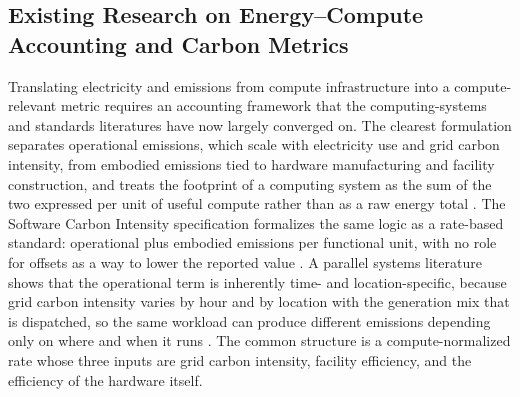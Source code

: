 \documentclass[12pt,a4paper]{article}
\begin{document}
\subsection{Existing Research on Energy--Compute Accounting and
Carbon Metrics}
%
%
%
%

Translating electricity and emissions from compute infrastructure
into a compute-relevant metric requires an accounting framework that
the computing-systems and standards literatures have now largely
converged on. The clearest formulation separates operational
emissions, which scale with electricity use and grid carbon
intensity, from embodied emissions tied to hardware manufacturing
and facility construction, and treats the footprint of a computing
system as the sum of the two expressed per unit of useful compute
rather than as a raw energy total
\citep{guptaetal-2022-chasingcarbonelusive}. The Software Carbon
Intensity specification formalizes the same logic as a rate-based
standard: operational plus embodied emissions per functional unit,
with no role for offsets as a way to lower the reported value
\citep{greensoftwarefoundation-2024-softwarecarbonintensity}. A
parallel systems literature shows that the operational term is
inherently time- and location-specific, because grid carbon intensity
varies by hour and by location with the generation mix that is
dispatched, so the same workload can produce different emissions
depending only on where and when it runs
\citep{radovanovicetal-2023-carbonawarecomputingdatacenters}. The
common structure is a compute-normalized rate whose three inputs are
grid carbon intensity, facility efficiency, and the efficiency of the
hardware itself.
\end{document}
